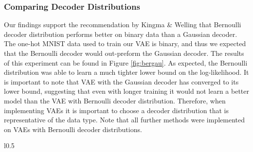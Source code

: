 \documentclass{article} %
\numberwithin{figure}{section}
\begin{document}
\subsubsection{Comparing Decoder Distributions}
Our findings support the recommendation by Kingma \& Welling that Bernoulli decoder distribution performs better on binary data than a Gaussian decoder. The one-hot MNIST data used to train our VAE is binary, and thus we expected that the Bernoulli decoder would out-preform the Gaussian decoder. The results of this experiment can be found in Figure \ref{fig:bergau}. As expected, the Bernoulli distribution was able to learn a much tighter lower bound on the log-likelihood. It is important to note that VAE with the Gaussian decoder has converged to its lower bound, suggesting that even with longer training it would not learn a better model than the VAE with Bernoulli decoder distribution. Therefore, when implementing VAEs it is important to choose a decoder distribution that is representative of the data type. Note that all further methods were implemented on VAEs with Bernoulli decoder distributions.
\begin{wrapfigure}{l}{0.5\textwidth}
  \captionsetup[subfigure]{justification=centering}
  \resizebox{\linewidth}{!}{}
  \caption{Bernoulli v.s Gaussian decoder distributions}
  \label{fig:bergau}
\end{wrapfigure}
\end{document}

